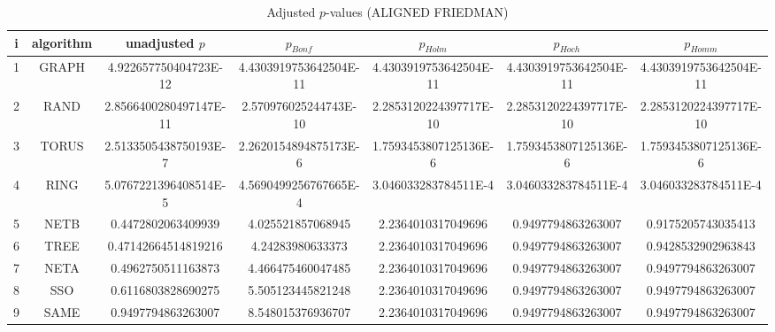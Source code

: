 \documentclass[a4paper,10pt]{article}
\begin{document}
\begin{landscape}
\begin{table}[!htp]
\centering\scriptsize
\caption{Adjusted $p$-values (ALIGNED FRIEDMAN)}
\begin{tabular}{ccccccc}
i&algorithm&unadjusted $p$&$p_{Bonf}$&$p_{Holm}$&$p_{Hoch}$&$p_{Homm}$\\
\hline
1& GRAPH&4.922657750404723E-12&4.4303919753642504E-11&4.4303919753642504E-11&4.4303919753642504E-11&4.4303919753642504E-11\\
2& RAND&2.8566400280497147E-11&2.570976025244743E-10&2.2853120224397717E-10&2.2853120224397717E-10&2.2853120224397717E-10\\
3& TORUS&2.5133505438750193E-7&2.2620154894875173E-6&1.7593453807125136E-6&1.7593453807125136E-6&1.7593453807125136E-6\\
4& RING&5.0767221396408514E-5&4.5690499256767665E-4&3.046033283784511E-4&3.046033283784511E-4&3.046033283784511E-4\\
5& NETB&0.4472802063409939&4.025521857068945&2.2364010317049696&0.9497794863263007&0.9175205743035413\\
6& TREE&0.47142664514819216&4.24283980633373&2.2364010317049696&0.9497794863263007&0.9428532902963843\\
7& NETA&0.4962750511163873&4.466475460047485&2.2364010317049696&0.9497794863263007&0.9497794863263007\\
8& SSO&0.6116803828690275&5.505123445821248&2.2364010317049696&0.9497794863263007&0.9497794863263007\\
9& SAME&0.9497794863263007&8.548015376936707&2.2364010317049696&0.9497794863263007&0.9497794863263007\\
\hline
\end{tabular}
\end{table}


\end{landscape}
\end{document}
